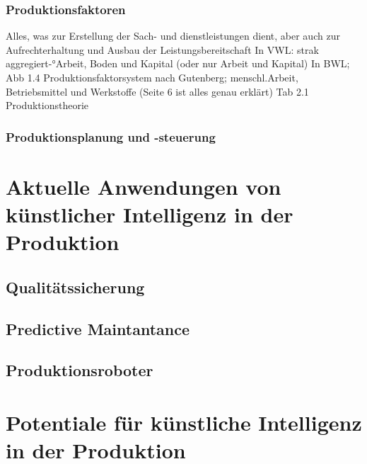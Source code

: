 \documentclass[a4paper,12pt, german]{report}
\begin{document}
\subsection{Produktionsfaktoren}

Alles, was zur Erstellung der Sach- und dienstleistungen dient, aber auch zur Aufrechterhaltung und Ausbau der Leistungsbereitschaft
In VWL: strak aggregiert-°Arbeit, Boden und Kapital (oder nur Arbeit und Kapital)
In BWL; Abb 1.4 Produktionsfaktorsystem nach Gutenberg; menschl.Arbeit, Betriebsmittel und Werkstoffe (Seite 6 ist alles genau erklärt)
Tab 2.1 Produktionstheorie

\subsection{Produktionsplanung und -steuerung}


\chapter{Aktuelle Anwendungen von künstlicher Intelligenz in der Produktion}






\section{Qualitätssicherung}

\section{Predictive Maintantance}


\section{Produktionsroboter}



\chapter{Potentiale für künstliche Intelligenz in der Produktion}
\end{document}
